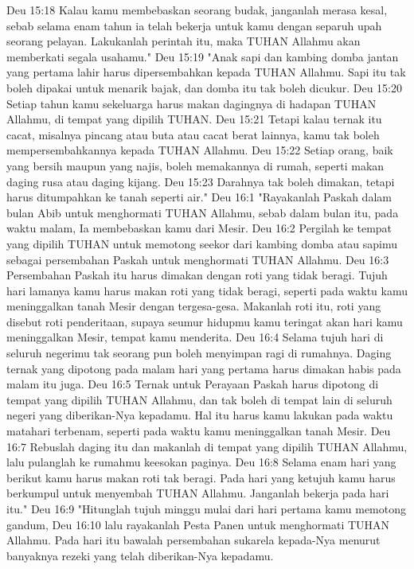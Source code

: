 Deu 15:18  Kalau kamu membebaskan seorang budak, janganlah merasa kesal, sebab selama enam tahun ia telah bekerja untuk kamu dengan separuh upah seorang pelayan. Lakukanlah perintah itu, maka TUHAN Allahmu akan memberkati segala usahamu."
Deu 15:19  "Anak sapi dan kambing domba jantan yang pertama lahir harus dipersembahkan kepada TUHAN Allahmu. Sapi itu tak boleh dipakai untuk menarik bajak, dan domba itu tak boleh dicukur.
Deu 15:20  Setiap tahun kamu sekeluarga harus makan dagingnya di hadapan TUHAN Allahmu, di tempat yang dipilih TUHAN.
Deu 15:21  Tetapi kalau ternak itu cacat, misalnya pincang atau buta atau cacat berat lainnya, kamu tak boleh mempersembahkannya kepada TUHAN Allahmu.
Deu 15:22  Setiap orang, baik yang bersih maupun yang najis, boleh memakannya di rumah, seperti makan daging rusa atau daging kijang.
Deu 15:23  Darahnya tak boleh dimakan, tetapi harus ditumpahkan ke tanah seperti air."
Deu 16:1  "Rayakanlah Paskah dalam bulan Abib untuk menghormati TUHAN Allahmu, sebab dalam bulan itu, pada waktu malam, Ia membebaskan kamu dari Mesir.
Deu 16:2  Pergilah ke tempat yang dipilih TUHAN untuk memotong seekor dari kambing domba atau sapimu sebagai persembahan Paskah untuk menghormati TUHAN Allahmu.
Deu 16:3  Persembahan Paskah itu harus dimakan dengan roti yang tidak beragi. Tujuh hari lamanya kamu harus makan roti yang tidak beragi, seperti pada waktu kamu meninggalkan tanah Mesir dengan tergesa-gesa. Makanlah roti itu, roti yang disebut roti penderitaan, supaya seumur hidupmu kamu teringat akan hari kamu meninggalkan Mesir, tempat kamu menderita.
Deu 16:4  Selama tujuh hari di seluruh negerimu tak seorang pun boleh menyimpan ragi di rumahnya. Daging ternak yang dipotong pada malam hari yang pertama harus dimakan habis pada malam itu juga.
Deu 16:5  Ternak untuk Perayaan Paskah harus dipotong di tempat yang dipilih TUHAN Allahmu, dan tak boleh di tempat lain di seluruh negeri yang diberikan-Nya kepadamu. Hal itu harus kamu lakukan pada waktu matahari terbenam, seperti pada waktu kamu meninggalkan tanah Mesir.
Deu 16:7  Rebuslah daging itu dan makanlah di tempat yang dipilih TUHAN Allahmu, lalu pulanglah ke rumahmu keesokan paginya.
Deu 16:8  Selama enam hari yang berikut kamu harus makan roti tak beragi. Pada hari yang ketujuh kamu harus berkumpul untuk menyembah TUHAN Allahmu. Janganlah bekerja pada hari itu."
Deu 16:9  "Hitunglah tujuh minggu mulai dari hari pertama kamu memotong gandum,
Deu 16:10  lalu rayakanlah Pesta Panen untuk menghormati TUHAN Allahmu. Pada hari itu bawalah persembahan sukarela kepada-Nya menurut banyaknya rezeki yang telah diberikan-Nya kepadamu.
